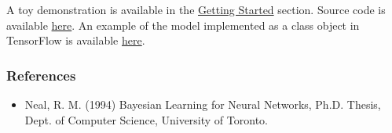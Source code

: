 A toy demonstration is available in the \href{getting-started}{Getting Started} section.
Source code is available
\href{https://github.com/blei-lab/edward/blob/master/examples/bayesian_nn.py}
{here}.
An example of the model implemented as a class object in TensorFlow is
available
\href{https://github.com/blei-lab/edward/blob/master/examples/tf_bayesian_nn.py}
{here}.

\subsubsection{References}\label{references}

\begin{itemize}
\item
  Neal, R. M. (1994) Bayesian Learning for Neural Networks, Ph.D.
  Thesis, Dept. of Computer Science, University of Toronto.
\end{itemize}
